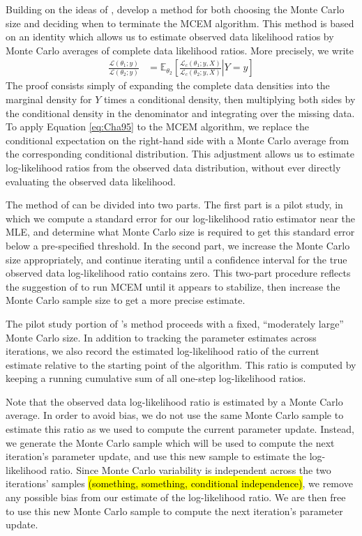 \documentclass[11pt, oneside]{article}   	%
\newcommand{\bE}{\mathbb{E}}
\begin{document}
Building on the ideas of \citeauthor{Wei90}, \citet{Cha95} develop a method for both choosing the Monte Carlo size and deciding when to terminate the MCEM algorithm. This method is based on an identity which allows us to estimate observed data likelihood ratios by Monte Carlo averages of complete data likelihood ratios. More precisely, we write
%
\begin{align}
	\frac{\mathcal{L}(\theta_1; y)}{\mathcal{L}(\theta_2; y)} &= \bE_{\theta_2} \left[ \left. \frac{\mathcal{L}_c(\theta_1; y, X)}{\mathcal{L}_c(\theta_2; y, X)} \right| Y=y \right] \label{eq:Cha95}
\end{align}
%
The proof consists simply of expanding the complete data densities into the marginal density for $Y$ times a conditional density, then multiplying both sides by the conditional density in the denominator and integrating over the missing data. To apply Equation \ref{eq:Cha95} to the MCEM algorithm, we replace the conditional expectation on the right-hand side with a Monte Carlo average from the corresponding conditional distribution. This adjustment allows us to estimate log-likelihood ratios from the observed data distribution, without ever directly evaluating the observed data likelihood. 



The method of \citeauthor{Cha95} can be divided into two parts. The first part is a pilot study, in which we compute a standard error for our log-likelihood ratio estimator near the MLE, and determine what Monte Carlo size is required to get this standard error below a pre-specified threshold. In the second part, we increase the Monte Carlo size appropriately, and continue iterating until a confidence interval for the true observed data log-likelihood ratio contains zero. This two-part procedure reflects the suggestion of \citet{Wei90} to run MCEM until it appears to stabilize, then increase the Monte Carlo sample size to get a more precise estimate.


The pilot study portion of \citeauthor{Cha95}'s method proceeds with a fixed, ``moderately large'' Monte Carlo size.  In addition to tracking the parameter estimates across iterations, we also record the estimated log-likelihood ratio of the current estimate relative to the starting point of the algorithm. This ratio is computed by keeping a running cumulative sum of all one-step log-likelihood ratios. 

Note that the observed data log-likelihood ratio is estimated by a Monte Carlo average. In order to avoid bias, we do not use the same Monte Carlo sample to estimate this ratio as we used to compute the current parameter update. Instead, we generate the Monte Carlo sample which will be used to compute the next iteration's parameter update, and use this new sample to estimate the log-likelihood ratio\footnotemark. Since Monte Carlo variability is independent across the two iterations' samples \hl{(something, something, conditional independence)}, we remove any possible bias from our estimate of the log-likelihood ratio. We are then free to use this new Monte Carlo sample to compute the next iteration's parameter update.
\end{document}
